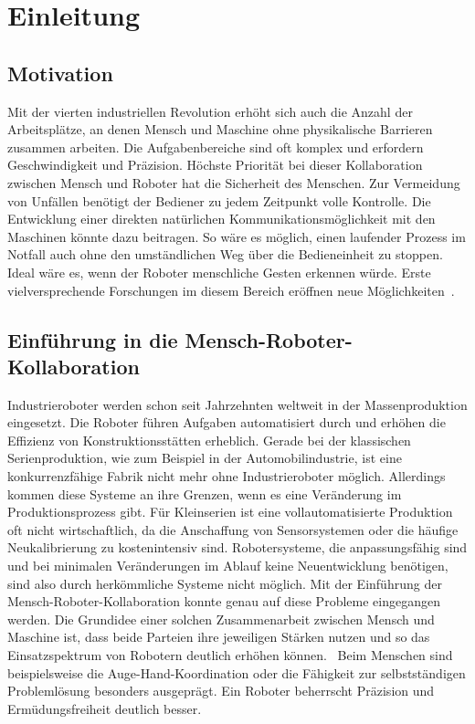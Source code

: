 \chapter{Einleitung}

\section{Motivation}
Mit der vierten industriellen Revolution erhöht sich auch die Anzahl der Arbeitsplätze, an denen Mensch und Maschine ohne physikalische Barrieren zusammen arbeiten. Die Aufgabenbereiche sind oft komplex und erfordern Geschwindigkeit und Präzision. Höchste Priorität bei dieser Kollaboration zwischen Mensch und Roboter hat die Sicherheit des Menschen. Zur Vermeidung von Unfällen benötigt der Bediener zu jedem Zeitpunkt volle Kontrolle. Die Entwicklung einer direkten natürlichen Kommunikationsmöglichkeit mit den Maschinen könnte dazu beitragen. So wäre es möglich, einen laufender Prozess im Notfall auch ohne den umständlichen Weg über die Bedieneinheit zu stoppen. Ideal wäre es, wenn der Roboter menschliche Gesten erkennen würde. Erste vielversprechende Forschungen im diesem Bereich eröffnen neue Möglichkeiten~\cite{flexibleSystem}.

\section{Einführung in die Mensch-Roboter-Kollaboration}
Industrieroboter werden schon seit Jahrzehnten weltweit in der Massenproduktion eingesetzt. Die Roboter führen Aufgaben automatisiert durch und erhöhen die Effizienz von Konstruktionsstätten erheblich. Gerade bei der klassischen Serienproduktion, wie zum Beispiel in der Automobilindustrie, ist eine konkurrenzfähige Fabrik nicht mehr ohne Industrieroboter möglich. Allerdings kommen diese Systeme an ihre Grenzen, wenn es eine Veränderung im Produktionsprozess gibt. Für Kleinserien ist eine vollautomatisierte Produktion oft nicht wirtschaftlich, da die Anschaffung von Sensorsystemen oder die häufige Neukalibrierung zu kostenintensiv sind. Robotersysteme, die anpassungsfähig sind und bei minimalen Veränderungen im Ablauf keine Neuentwicklung benötigen, sind also durch herkömmliche Systeme nicht möglich. Mit der Einführung der Mensch-Roboter-Kollaboration konnte genau auf diese Probleme eingegangen werden. Die Grundidee einer solchen Zusammenarbeit zwischen Mensch und Maschine ist, dass beide Parteien ihre jeweiligen Stärken nutzen und so das Einsatzspektrum von Robotern deutlich erhöhen können.~\cite{ObererTreitz.2019} Beim Menschen sind beispielsweise die Auge-Hand-Koordination oder die Fähigkeit zur selbstständigen Problemlösung besonders ausgeprägt. Ein Roboter beherrscht Präzision und Ermüdungsfreiheit deutlich besser.~\cite{fraunhoferMRK}

